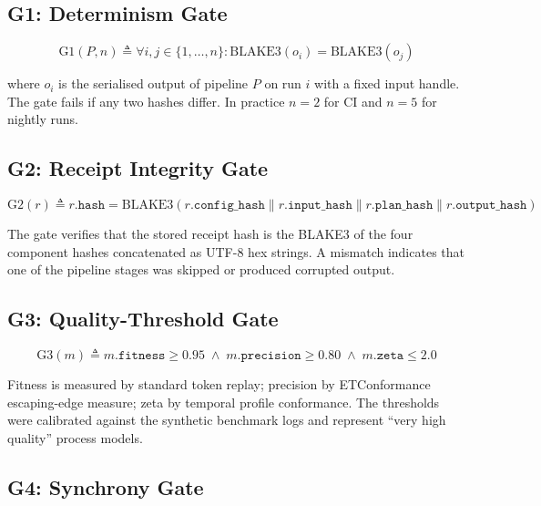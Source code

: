 \documentclass[11pt,a4paper]{article}
\begin{document}
\subsection{G1: Determinism Gate}

\begin{equation}
  \text{G1}(P, n) \triangleq \forall i,j \in \{1,\ldots,n\} \colon
    \text{BLAKE3}(o_i) = \text{BLAKE3}(o_j)
\end{equation}

where $o_i$ is the serialised output of pipeline $P$ on run $i$ with a
fixed input handle. The gate fails if any two hashes differ. In practice
$n = 2$ for CI and $n = 5$ for nightly runs.

\subsection{G2: Receipt Integrity Gate}

\begin{equation}
  \text{G2}(r) \triangleq
    r.\texttt{hash} = \text{BLAKE3}(r.\texttt{config\_hash} \| r.\texttt{input\_hash}
                              \| r.\texttt{plan\_hash} \| r.\texttt{output\_hash})
\end{equation}

The gate verifies that the stored receipt hash is the BLAKE3 of the four
component hashes concatenated as UTF-8 hex strings. A mismatch indicates
that one of the pipeline stages was skipped or produced corrupted output.

\subsection{G3: Quality-Threshold Gate}

\begin{equation}
  \text{G3}(m) \triangleq m.\texttt{fitness} \geq 0.95 \;\land\;
                            m.\texttt{precision} \geq 0.80 \;\land\;
                            m.\texttt{zeta} \leq 2.0
\end{equation}

Fitness is measured by standard token replay; precision by
ETConformance escaping-edge measure; zeta by temporal profile
conformance. The thresholds were calibrated against the synthetic
benchmark logs and represent ``very high quality'' process models.

\subsection{G4: Synchrony Gate}
\end{document}
